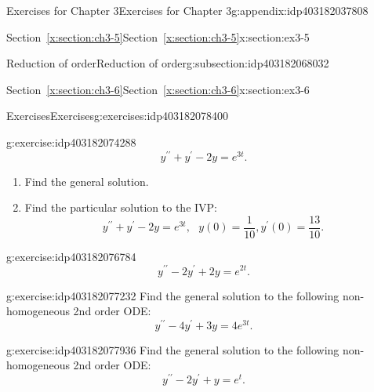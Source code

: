 \documentclass[oneside,10pt,]{book}
\newcommand{\xreffont}{\relax}
\numberwithin{equation}{section}
\numberwithin{equation}{section}
\begin{document}
\begin{appendixptx}{Exercises for Chapter 3}{}{Exercises for Chapter 3}{}{}{g:appendix:idp403182037808}
\begin{sectionptx}{Section~{\xreffont\ref*{x:section:ch3-5}}}{}{Section~{\xreffont\ref*{x:section:ch3-5}}}{}{}{x:section:ex3-5}
\begin{subsectionptx}{Reduction of order}{}{Reduction of order}{}{}{g:subsection:idp403182068032}
\end{subsectionptx}
\end{sectionptx}
%
%
\typeout{************************************************}
\typeout{Section D.5 Section~{\xreffont\ref*{x:section:ch3-6}}}
\typeout{************************************************}
%
\begin{sectionptx}{Section~{\xreffont\ref*{x:section:ch3-6}}}{}{Section~{\xreffont\ref*{x:section:ch3-6}}}{}{}{x:section:ex3-6}
%
%
\typeout{************************************************}
\typeout{************************************************}
%
\begin{exercises-subsection-numberless}{Exercises}{}{Exercises}{}{}{g:exercises:idp403182078400}
\begin{divisionexercise}{1}{}{}{g:exercise:idp403182074288}%
%
\begin{equation*}
y^{\prime\prime}+y^{\prime}-2y=e^{3t}.
\end{equation*}
%
\begin{enumerate}[label=(\alph*)]
\item{}Find the general solution.%
\item{}Find the particular solution to the IVP:%
\begin{equation*}
y^{\prime\prime}+y^{\prime}-2y=e^{3t},\,\,\,\,y(0)=\frac{1}{10},y^{\prime}(0)=\frac{13}{10}.
\end{equation*}
%
\end{enumerate}
\end{divisionexercise}%
\begin{divisionexercise}{2}{}{}{g:exercise:idp403182076784}%
%
\begin{equation*}
y^{\prime\prime}-2y^{\prime}+2y=e^{2t}.
\end{equation*}
\end{divisionexercise}%
\begin{divisionexercise}{3}{}{}{g:exercise:idp403182077232}%
Find the general solution to the following non-homogeneous 2nd order ODE:%
\begin{equation*}
y^{\prime\prime}-4y^{\prime}+3y=4e^{3t}.
\end{equation*}
%
\end{divisionexercise}%
\begin{divisionexercise}{4}{}{}{g:exercise:idp403182077936}%
Find the general solution to the following non-homogeneous 2nd order ODE:%
\begin{equation*}
y^{\prime\prime}-2y^{\prime}+y=e^{t}.
\end{equation*}

\end{divisionexercise}
\end{exercises-subsection-numberless}
\end{sectionptx}
\end{appendixptx}
\end{document}
